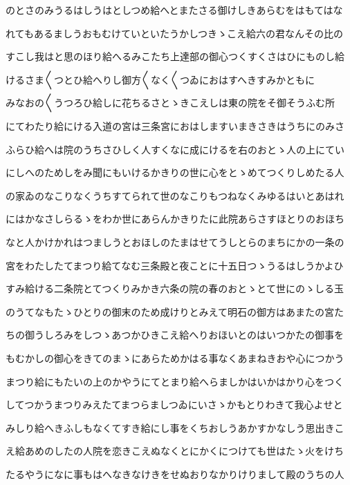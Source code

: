 \documentclass[a4paper,11pt,landscape]{ltjtarticle}
\begin{document}
\par\medskip
のとさのみうるはしうはとしつめ給へとまたさる御けしきあらむをはもてはな
\par\medskip
れてもあるましうおもむけていといたうかしつきゝこえ給六の君なんその比の
\par\medskip
すこし我はと思のほり給へるみこたち上達部の御心つくすくさはひにものし給
\par\medskip
けるさま〱つとひ給へりし御方〱なく〱つゐにおはすへきすみかともに
\par\medskip
みなおの〱うつろひ給しに花ちるさとゝきこえしは東の院をそ御そうふむ所
\par\medskip
にてわたり給にける入道の宮は三条宮におはしますいまきさきはうちにのみさ
\par\medskip
ふらひ給へは院のうちさひしく人すくなに成にけるを右のおとゝ人の上にてい
\par\medskip
にしへのためしをみ聞にもいけるかきりの世に心をとゝめてつくりしめたる人
\par\medskip
の家ゐのなこりなくうちすてられて世のなこりもつねなくみゆるはいとあはれ
\par\medskip
にはかなさしらるゝをわか世にあらんかきりたに此院あらさすほとりのおほち
\par\medskip
なと人かけかれはつましうとおほしのたまはせてうしとらのまちにかの一条の
\par\medskip
宮をわたしたてまつり給てなむ三条殿と夜ことに十五日つゝうるはしうかよひ
\par\medskip
すみ給ける二条院とてつくりみかき六条の院の春のおとゝとて世にのゝしる玉
\par\medskip
のうてなもたゝひとりの御末のため成けりとみえて明石の御方はあまたの宮た
\par\medskip
ちの御うしろみをしつゝあつかひきこえ給へりおほいとのはいつかたの御事を
\par\medskip
もむかしの御心をきてのまゝにあらためかはる事なくあまねきおや心につかう
\par\medskip
まつり給にもたいの上のかやうにてとまり給へらましかはいかはかり心をつく
\par\medskip
してつかうまつりみえたてまつらましつゐにいさゝかもとりわきて我心よせと
\par\medskip
みしり給へきふしもなくてすき給にし事をくちおしうあかすかなしう思出きこ
\par\medskip
え給あめのしたの人院を恋きこえぬなくとにかくにつけても世はたゝ火をけち
\par\medskip
たるやうになに事もはへなきなけきをせぬおりなかりけりまして殿のうちの人
\par\medskip
\end{document}

